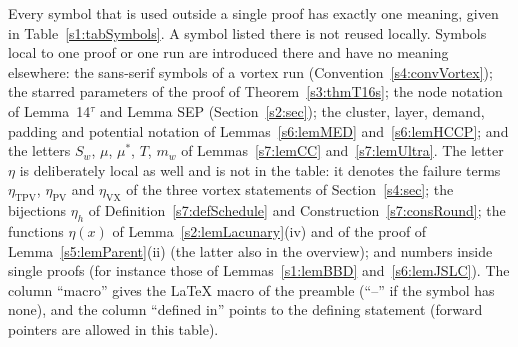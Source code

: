 Every symbol that is used outside a single proof has exactly one meaning, given in
Table~\ref{s1:tabSymbols}. A symbol listed there is not reused locally. Symbols
local to one proof or one run are introduced there and have no meaning elsewhere:
the sans-serif symbols of a vortex run (Convention~\ref{s4:convVortex}); the
starred parameters of the proof of Theorem~\ref{s3:thmT16s}; the node notation of
Lemma~14$^\tau$ and Lemma SEP (Section~\ref{s2:sec}); the cluster, layer,
demand, padding and potential notation of Lemmas~\ref{s6:lemMED}
and~\ref{s6:lemHCCP}; and the letters $S_w$, $\mu$, $\mu^*$, $T$, $m_w$ of
Lemmas~\ref{s7:lemCC} and~\ref{s7:lemUltra}. The letter $\eta$ is deliberately
local as well and is not in the table: it denotes the failure terms
$\eta_{\mathrm{TPV}}$, $\eta_{\mathrm{PV}}$ and $\eta_{\mathrm{VX}}$ of the three
vortex statements of Section~\ref{s4:sec}; the bijections $\eta_h$ of
Definition~\ref{s7:defSchedule} and Construction~\ref{s7:consRound}; the
functions $\eta(x)$ of Lemma~\ref{s2:lemLacunary}(iv) and of the proof of
Lemma~\ref{s5:lemParent}(ii) (the latter also in the overview); and numbers
inside single proofs (for instance those of Lemmas~\ref{s1:lemBBD}
and~\ref{s6:lemJSLC}). The column ``macro'' gives the
\LaTeX{} macro of the preamble (``--'' if the symbol has none), and the column
``defined in'' points to the defining statement (forward pointers are allowed in
this table).

